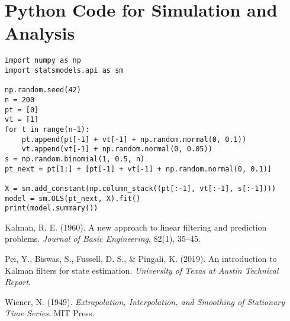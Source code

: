 \documentclass[12pt]{article}
\begin{document}
\section{Python Code for Simulation and Analysis}
\label{app:code}

\begin{lstlisting}
import numpy as np
import statsmodels.api as sm

np.random.seed(42)
n = 200
pt = [0]
vt = [1]
for t in range(n-1):
    pt.append(pt[-1] + vt[-1] + np.random.normal(0, 0.1))
    vt.append(vt[-1] + np.random.normal(0, 0.05))
s = np.random.binomial(1, 0.5, n)
pt_next = pt[1:] + [pt[-1] + vt[-1] + np.random.normal(0, 0.1)]

X = sm.add_constant(np.column_stack((pt[:-1], vt[:-1], s[:-1])))
model = sm.OLS(pt_next, X).fit()
print(model.summary())
\end{lstlisting}


\begin{thebibliography}{9}
Kalman, R. E. (1960). A new approach to linear filtering and prediction problems. \textit{Journal of Basic Engineering}, 82(1), 35--45.

Pei, Y., Biswas, S., Fussell, D. S., \& Pingali, K. (2019). An introduction to Kalman filters for state estimation. \textit{University of Texas at Austin Technical Report}.

Wiener, N. (1949). \textit{Extrapolation, Interpolation, and Smoothing of Stationary Time Series}. MIT Press.
\end{thebibliography}
\end{document}
